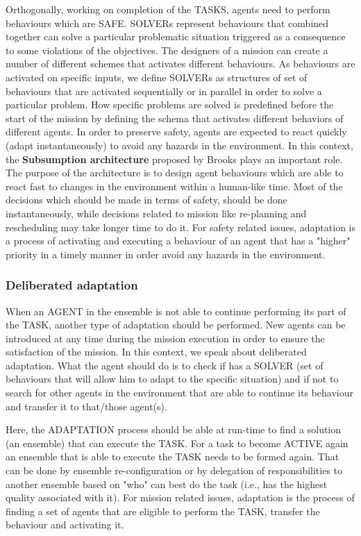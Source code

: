 \documentclass[journal]{IEEEtran}
\theoremstyle{definition}
\begin{document}
Orthogonally, working on completion of the TASKS, agents need to perform behaviours which are SAFE. SOLVERs represent behaviours that combined together can solve a particular problematic situation triggered as a consequence to some violations of the objectives. The designers of a mission can create a number of different schemes that activates different behaviours. As behaviours are activated on specific inputs, we define SOLVERs as structures of set of behaviours that are activated sequentially or in parallel in order to  solve a particular problem.
How specific problems are solved is predefined before the start of the mission by defining the schema that activates different behaviors of different agents.
In order to preserve safety, agents are expected to react quickly (adapt instantaneously) to avoid any hazards in the environment. In this context, the \textbf{Subsumption architecture} proposed by Brooks plays an important role. The purpose of the architecture is to design agent behaviours which are able to react fast to changes in the environment within a human-like time. 
Most of the decisions which should be made in terms of safety, should be done instantaneously, while decisions related to mission like re-planning and rescheduling may take longer time to do it. 
For safety related issues, adaptation is a process of activating and executing a behaviour of an agent that has a "higher" priority in a timely manner in order avoid any hazards in the environment.

\subsubsection{Deliberated adaptation}

When an AGENT in the ensemble is not able to continue performing its part of the TASK, another type of adaptation should be performed.
New agents can be introduced at any time during the mission execution in order to ensure the satisfaction of the mission.
In this context, we speak about deliberated adaptation. What the agent should do is to check if has a SOLVER (set of behaviours that will allow him to adapt to the specific situation) and if not to search for other agents in the environment that are able to continue its behaviour and transfer it to that/those agent(s).

Here, the ADAPTATION process should be able at run-time to find a solution (an ensemble) that  can execute the TASK. For a task to become ACTIVE again an ensemble that is able to execute the TASK needs to be formed again. That can be done by ensemble re-configuration or by delegation of responsibilities to another ensemble based on "who" can best do the task (i.e., has the highest quality associated with it). 
For mission related issues, adaptation is the process of finding a set of agents that are eligible to perform the TASK, transfer the behaviour and activating it.
\end{document}
